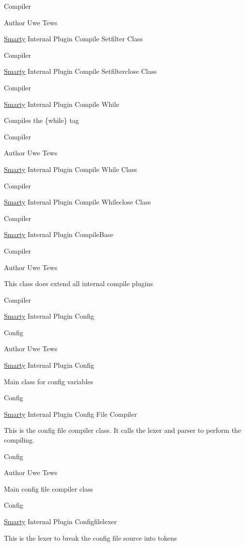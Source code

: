 Compiler \begin{DoxyAuthor}{Author}
Uwe Tews
\end{DoxyAuthor}
\hyperlink{class_smarty}{Smarty} Internal Plugin Compile Setfilter Class

Compiler

\hyperlink{class_smarty}{Smarty} Internal Plugin Compile Setfilterclose Class

Compiler

\hyperlink{class_smarty}{Smarty} Internal Plugin Compile While

Compiles the \{while\} tag

Compiler \begin{DoxyAuthor}{Author}
Uwe Tews
\end{DoxyAuthor}
\hyperlink{class_smarty}{Smarty} Internal Plugin Compile While Class

Compiler

\hyperlink{class_smarty}{Smarty} Internal Plugin Compile Whileclose Class

Compiler

\hyperlink{class_smarty}{Smarty} Internal Plugin Compile\+Base

Compiler \begin{DoxyAuthor}{Author}
Uwe Tews
\end{DoxyAuthor}
This class does extend all internal compile plugins

Compiler

\hyperlink{class_smarty}{Smarty} Internal Plugin Config

Config \begin{DoxyAuthor}{Author}
Uwe Tews
\end{DoxyAuthor}
\hyperlink{class_smarty}{Smarty} Internal Plugin Config

Main class for config variables

Config

\hyperlink{class_smarty}{Smarty} Internal Plugin Config File Compiler

This is the config file compiler class. It calls the lexer and parser to perform the compiling.

Config \begin{DoxyAuthor}{Author}
Uwe Tews
\end{DoxyAuthor}
Main config file compiler class

Config

\hyperlink{class_smarty}{Smarty} Internal Plugin Configfilelexer

This is the lexer to break the config file source into tokens

